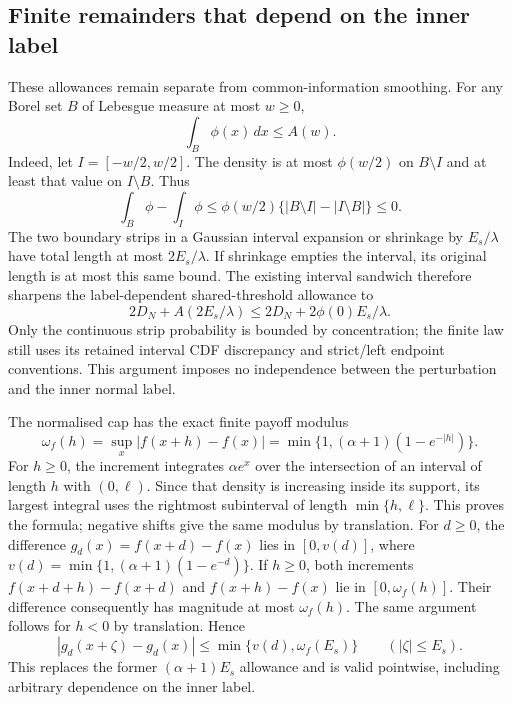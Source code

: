 \subsection{Finite remainders that depend on the inner label}

These allowances remain separate from common-information smoothing.
For any Borel set $B$ of Lebesgue measure at most $w\geq0$,
\begin{equation}
 \int_B\phi(x)\,dx\leq A(w).
 \label{eq:sharp-normal-set-concentration}
\end{equation}
Indeed, let $I=[-w/2,w/2]$. The density is at most $\phi(w/2)$ on
$B\setminus I$ and at least that value on $I\setminus B$. Thus
\begin{equation}
 \int_B\phi-\int_I\phi
 \leq\phi(w/2)\{|B\setminus I|-|I\setminus B|\}\leq0.
 \label{eq:sharp-normal-set-proof}
\end{equation}
The two boundary strips in a Gaussian interval expansion or shrinkage
by $E_s/\lambda$ have total length at most $2E_s/\lambda$.
If shrinkage empties the interval, its original length is at most this
same bound. The existing interval sandwich therefore sharpens the
label-dependent shared-threshold allowance to
\begin{equation}
 2D_N+A(2E_s/\lambda)
       \leq2D_N+2\phi(0)E_s/\lambda.
 \label{eq:sharp-threshold-inner-remainder}
\end{equation}
Only the continuous strip probability is bounded by concentration;
the finite law still uses its retained interval CDF discrepancy and
strict/left endpoint conventions. This argument imposes no independence
between the perturbation and the inner normal label.

The normalised cap has the exact finite payoff modulus
\begin{equation}
 \omega_f(h)=\sup_x|f(x+h)-f(x)|
       =\min\{1,(\alpha+1)(1-e^{-|h|})\}.
 \label{eq:sharp-cap-payoff-modulus}
\end{equation}
For $h\geq0$, the increment integrates $\alpha e^x$ over the intersection
of an interval of length $h$ with $(0,\ell)$. Since that density is
increasing inside its support, its largest integral uses the rightmost
subinterval of length $\min\{h,\ell\}$. This proves the formula;
negative shifts give the same modulus by translation. For $d\geq0$,
the difference $g_d(x)=f(x+d)-f(x)$ lies in $[0,v(d)]$, where
$v(d)=\min\{1,(\alpha+1)(1-e^{-d})\}$. If $h\geq0$, both increments
$f(x+d+h)-f(x+d)$ and $f(x+h)-f(x)$ lie in $[0,\omega_f(h)]$.
Their difference consequently has magnitude at most $\omega_f(h)$.
The same argument follows for $h<0$ by translation. Hence
\begin{equation}
 |g_d(x+\zeta)-g_d(x)|
 \leq\min\{v(d),\omega_f(E_s)\}\qquad(|\zeta|\leq E_s).
 \label{eq:sharp-raw-inner-remainder}
\end{equation}
This replaces the former $(\alpha+1)E_s$ allowance and is valid
pointwise, including arbitrary dependence on the inner label.
